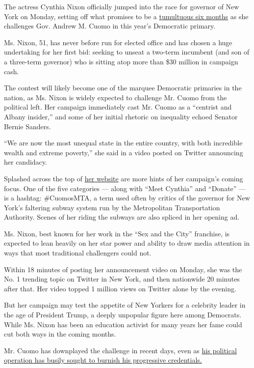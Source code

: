 The actress Cynthia Nixon officially jumped into the race for governor
of New York on Monday, setting off what promises to be a
\href{https://www.nytimes3xbfgragh.onion/2018/03/07/nyregion/cuomo-cynthia-nixon-de-blasio-governor.html}{tumultuous
six months} as she challenges Gov. Andrew M. Cuomo in this year's
Democratic primary.

Ms. Nixon, 51, has never before run for elected office and has chosen a
huge undertaking for her first bid: seeking to unseat a two-term
incumbent (and son of a three-term governor) who is sitting atop more
than \$30 million in campaign cash.

The contest will likely become one of the marquee Democratic primaries
in the nation, as Ms. Nixon is widely expected to challenge Mr. Cuomo
from the political left. Her campaign immediately cast Mr. Cuomo as a
``centrist and Albany insider,'' and some of her initial rhetoric on
inequality echoed Senator Bernie Sanders.

``We are now the most unequal state in the entire country, with both
incredible wealth and extreme poverty,'' she said in a video posted on
Twitter announcing her candidacy.

Splashed across the top of \href{https://cynthiafornewyork.com/}{her
website} are more hints of her campaign's coming focus. One of the five
categories --- along with ``Meet Cynthia'' and ``Donate'' --- is a
hashtag: \#CuomosMTA, a term used often by critics of the governor for
New York's faltering subway system run by the Metropolitan
Transportation Authority. Scenes of her riding the subways are also
spliced in her opening ad.

Ms. Nixon, best known for her work in the ``Sex and the City''
franchise, is expected to lean heavily on her star power and ability to
draw media attention in ways that most traditional challengers could
not.

Within 18 minutes of posting her announcement video on Monday, she was
the No. 1 trending topic on Twitter in New York, and then nationwide 20
minutes after that. Her video topped 1 million views on Twitter alone by
the evening.

But her campaign may test the appetite of New Yorkers for a celebrity
leader in the age of President Trump, a deeply unpopular figure here
among Democrats. While Ms. Nixon has been an education activist for many
years her fame could cut both ways in the coming months.

Mr. Cuomo has downplayed the challenge in recent days, even as
\href{https://www.nytimes3xbfgragh.onion/2018/03/16/nyregion/cynthia-nixon-cuomo-governor.html}{his
political operation has busily sought to burnish his progressive
credentials.}

